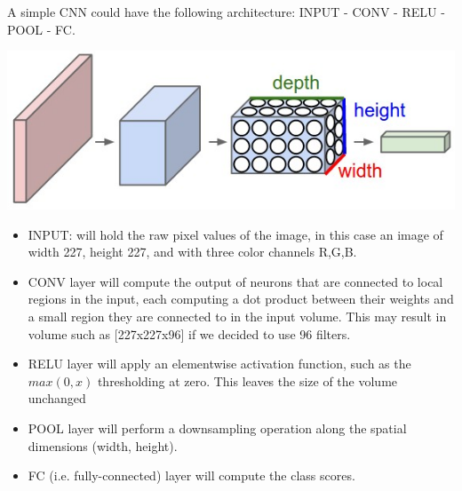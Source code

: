 \documentclass[10pt]{article}
\begin{document}
\begin{multicols}{2}
  A simple CNN could have the following architecture: INPUT - CONV - RELU - POOL - FC.

  \begin{center}
    \includegraphics[width=\linewidth]{img/cnn}
  \end{center}

  \begin{itemize}
  \item INPUT: will hold the raw pixel values of the image,
    in this case an image of width 227, height 227, and with three color channels R,G,B.
    
  \item CONV layer will compute the output of neurons that are connected to local regions
    in the input, each computing a dot product between their weights and a small region
    they are connected to in the input volume. This may result in volume such as
    [227x227x96] if we decided to use 96 filters.

  \item RELU layer will apply an elementwise activation function,
    such as the $max(0,x)$ thresholding at zero.
    This leaves the size of the volume unchanged

  \item POOL layer will perform a downsampling operation along the spatial
    dimensions (width, height).

  \item FC (i.e. fully-connected) layer will compute the class scores.
    
  \end{itemize}
 

\end{multicols}
\end{document}
